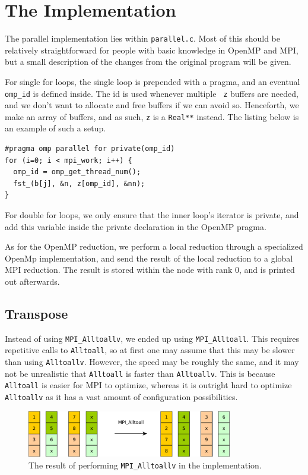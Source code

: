 \section{The Implementation}

The parallel implementation lies within {\tt parallel.c}. Most of this should be
relatively straightforward for people with basic knowledge in OpenMP and MPI,
but a small description of the changes from the original program will be given.

For single for loops, the single loop is prepended with a pragma, and an
eventual {\tt omp\_id} is defined inside. The id is used whenever multiple {\tt
  z} buffers are needed, and we don't want to allocate and free buffers if we
can avoid so. Henceforth, we make an array of buffers, and as such, {\tt z} is
a {\tt Real**} instead. The listing below is an example of such a setup.

\begin{lstlisting}
#pragma omp parallel for private(omp_id)
for (i=0; i < mpi_work; i++) {
  omp_id = omp_get_thread_num();
  fst_(b[j], &n, z[omp_id], &nn);
}
\end{lstlisting}

For double for loops, we only ensure that the inner loop's iterator is private,
and add this variable inside the private declaration in the OpenMP pragma.

As for the OpenMP reduction, we perform a local reduction through a specialized
OpenMp implementation, and send the result of the local reduction to a global
MPI reduction. The result is stored within the node with rank 0, and is printed
out afterwards.

\subsection{Transpose}

Instead of using \verb|MPI_Alltoallv|, we ended up using \verb|MPI_Alltoall|.
This requires repetitive calls to {\tt Alltoall}, so at first one may assume
that this may be slower than using {\tt Alltoallv}. However, the speed may be
roughly the same, and it may not be unrealistic that {\tt Alltoall} is faster
than {\tt Alltoallv}. This is because {\tt Alltoall} is easier for MPI to
optimize, whereas it is outright hard to optimize {\tt Alltoallv} as it has a
vast amount of configuration possibilities.

\begin{figure}[h]
  \centering
  \includegraphics[width=0.8\textwidth]{img/transpose-1.pdf}
  \caption{The result of performing {\tt MPI\_Alltoallv} in the implementation.}
  \label{fig:t1}
\end{figure}

